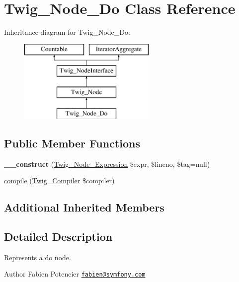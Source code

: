 \hypertarget{classTwig__Node__Do}{}\section{Twig\+\_\+\+Node\+\_\+\+Do Class Reference}
\label{classTwig__Node__Do}
Inheritance diagram for Twig\+\_\+\+Node\+\_\+\+Do\+:\begin{figure}[H]
\begin{center}
\leavevmode
\includegraphics[height=4.000000cm]{classTwig__Node__Do}
\end{center}
\end{figure}
\subsection*{Public Member Functions}
\begin{DoxyCompactItemize}
\item 
{\bfseries \+\_\+\+\_\+construct} (\hyperlink{classTwig__Node__Expression}{Twig\+\_\+\+Node\+\_\+\+Expression} \$expr, \$lineno, \$tag=null)\hypertarget{classTwig__Node__Do_a85efdf0cf8f51d59a80371db5612016e}{}\label{classTwig__Node__Do_a85efdf0cf8f51d59a80371db5612016e}

\item 
\hyperlink{classTwig__Node__Do_a91c78bd45b233b4f573fb2e0b119b7c7}{compile} (\hyperlink{classTwig__Compiler}{Twig\+\_\+\+Compiler} \$compiler)
\end{DoxyCompactItemize}
\subsection*{Additional Inherited Members}


\subsection{Detailed Description}
Represents a do node.

\begin{DoxyAuthor}{Author}
Fabien Potencier \href{mailto:fabien@symfony.com}{\tt fabien@symfony.\+com} 
\end{DoxyAuthor}


